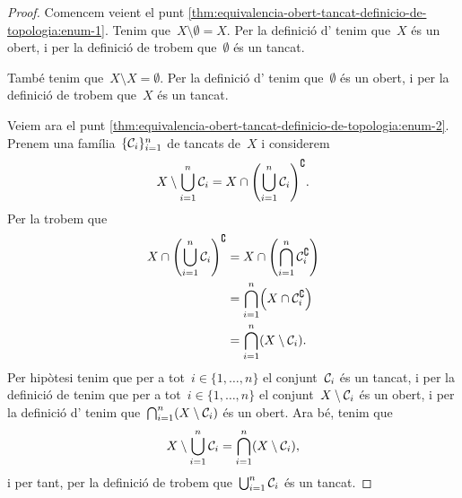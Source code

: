 \documentclass[../topologia.tex]{subfiles}
\begin{document}
    \begin{proof}
        Comencem veient el punt \eqref{thm:equivalencia-obert-tancat-definicio-de-topologia:enum-1}.
        Tenim que~\(X\setminus\emptyset=X\).
        Per la definició d' tenim que~\(X\) és un obert, i per la definició de  trobem que~\(\emptyset\) és un tancat.

        També tenim que~\(X\setminus X=\emptyset\).
        Per la definició d' tenim que~\(\emptyset\) és un obert, i per la definició de  trobem que~\(X\) és un tancat.

        Veiem ara el punt \eqref{thm:equivalencia-obert-tancat-definicio-de-topologia:enum-2}.
        Prenem una família~\(\{\mathcal{C}_{i}\}_{i=1}^{n}\) de tancats de~\(X\) i considerem
        \[
            X\setminus\bigcup_{i=1}^{n}\tancat{C}_{i}=X\cap\left(\bigcup_{i=1}^{n}\tancat{C}_{i}\right)^{\complement}.
        \]
        Per la  trobem que
        \begin{align*}
            X\cap\left(\bigcup_{i=1}^{n}\tancat{C}_{i}\right)^{\complement}&=X\cap\left(\bigcap_{i=1}^{n}\tancat{C}_{i}^{\complement}\right) \\
            &=\bigcap_{i=1}^{n}\left(X\cap\tancat{C}_{i}^{\complement}\right) \\
            &=\bigcap_{i=1}^{n}\left(X\setminus\tancat{C}_{i}\right).
        \end{align*}
        Per hipòtesi tenim que per a tot~\(i\in\{1,\dots,n\}\) el conjunt~\(\mathcal{C}_{i}\) és un tancat, i per la definició de  tenim que per a tot~\(i\in\{1,\dots,n\}\) el conjunt~\(X\setminus\mathcal{C}_{i}\) és un obert, i per la definició d' tenim que~\(\bigcap_{i=1}^{n}\left(X\setminus\tancat{C}_{i}\right)\) és un obert.
        Ara bé, tenim que
        \[
            X\setminus\bigcup_{i=1}^{n}\tancat{C}_{i}=\bigcap_{i=1}^{n}\left(X\setminus\tancat{C}_{i}\right),
        \]
        i per tant, per la definició de  trobem que~\(\bigcup_{i=1}^{n}\mathcal{C}_{i}\) és un tancat.


\end{proof}
\end{document}
